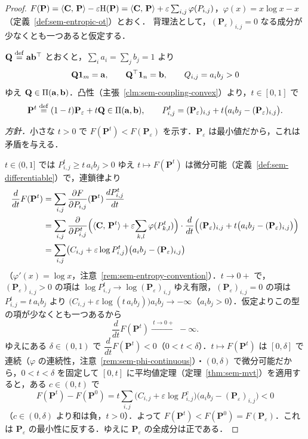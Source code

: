\begin{proof}
  $F(\mathbf{P}) = \langle \mathbf{C},\, \mathbf{P} \rangle - \varepsilon\mathrm{H}(\mathbf{P}) = \langle \mathbf{C},\, \mathbf{P} \rangle + \varepsilon\sum_{i,j}\varphi(P_{i,j})$，$\varphi(x) = x\log x - x$（定義~\ref{def:sem-entropic-ot}）とおく．
  背理法として，$(\mathbf{P}_\varepsilon)_{i,j} = 0$ なる成分が少なくとも一つあると仮定する．

  $\mathbf{Q} \overset{\mathrm{def}}{=} \mathbf{a}\mathbf{b}^\top$ とおくと，$\sum_i a_i = \sum_j b_j = 1$ より
  \[
    \mathbf{Q}\mathbf{1}_m = \mathbf{a}, \qquad
    \mathbf{Q}^\top\mathbf{1}_n = \mathbf{b}, \qquad
    Q_{i,j} = a_i b_j > 0
  \]
  ゆえ $\mathbf{Q} \in \Pi(\mathbf{a}, \mathbf{b})$．凸性（主張~\ref{clm:sem-coupling-convex}）より，$t \in [0,1]$ で
  \[
    \mathbf{P}^t \overset{\mathrm{def}}{=} (1-t)\mathbf{P}_\varepsilon + t\mathbf{Q} \in \Pi(\mathbf{a}, \mathbf{b}),
    \qquad
    P^t_{i,j} = (\mathbf{P}_\varepsilon)_{i,j} + t\bigl(a_i b_j - (\mathbf{P}_\varepsilon)_{i,j}\bigr) .
  \]

  \emph{方針．}小さな $t > 0$ で $F(\mathbf{P}^t) < F(\mathbf{P}_\varepsilon)$ を示す．$\mathbf{P}_\varepsilon$ は最小値だから，これは矛盾を与える．

  $t \in (0,1]$ では $P^t_{i,j} \ge t\,a_i b_j > 0$ ゆえ $t \mapsto F(\mathbf{P}^t)$ は微分可能（定義~\ref{def:sem-differentiable}）で，連鎖律より
  \begin{align*}
    \frac{d}{dt} F(\mathbf{P}^t)
    &= \sum_{i,j} \frac{\partial F}{\partial P_{i,j}}(\mathbf{P}^t)\,\frac{dP^t_{i,j}}{dt} \\
    &= \sum_{i,j}
       \frac{\partial}{\partial P^t_{i,j}}\Bigl( \langle \mathbf{C},\, \mathbf{P}^t \rangle + \varepsilon\!\sum_{k,l}\varphi(P^t_{k,l}) \Bigr)
       \cdot \frac{d}{dt}\Bigl( (\mathbf{P}_\varepsilon)_{i,j} + t\bigl(a_i b_j - (\mathbf{P}_\varepsilon)_{i,j}\bigr) \Bigr) \\
    &= \sum_{i,j} \bigl( C_{i,j} + \varepsilon\log P^t_{i,j} \bigr)\bigl( a_i b_j - (\mathbf{P}_\varepsilon)_{i,j} \bigr)
  \end{align*}
  （$\varphi'(x) = \log x$，注意~\ref{rem:sem-entropy-convention}）．$t \to 0+$ で，$(\mathbf{P}_\varepsilon)_{i,j} > 0$ の項は $\log P^t_{i,j} \to \log (\mathbf{P}_\varepsilon)_{i,j}$ ゆえ有限，$(\mathbf{P}_\varepsilon)_{i,j} = 0$ の項は $P^t_{i,j} = t\,a_i b_j$ より $\bigl(C_{i,j} + \varepsilon\log(t\,a_i b_j)\bigr)a_i b_j \to -\infty$（$a_i b_j > 0$）．仮定よりこの型の項が少なくとも一つあるから
  \[
    \frac{d}{dt} F(\mathbf{P}^t) \xrightarrow{\ t \to 0+\ } -\infty .
  \]
  ゆえにある $\delta \in (0,1)$ で $\dfrac{d}{dt} F(\mathbf{P}^t) < 0$（$0 < t < \delta$）．$t \mapsto F(\mathbf{P}^t)$ は $[0,\delta]$ で連続（$\varphi$ の連続性，注意~\ref{rem:sem-phi-continuous}）・$(0,\delta)$ で微分可能だから，$0 < t < \delta$ を固定して $[0,t]$ に平均値定理（定理~\ref{thm:sem-mvt}）を適用すると，ある $c \in (0,t)$ で
  \[
    F(\mathbf{P}^t) - F(\mathbf{P}^0)
    = t \sum_{i,j}\bigl(C_{i,j} + \varepsilon\log P^c_{i,j}\bigr)\bigl(a_i b_j - (\mathbf{P}_\varepsilon)_{i,j}\bigr) < 0
  \]
  （$c \in (0,\delta)$ より和は負，$t > 0$）．よって $F(\mathbf{P}^t) < F(\mathbf{P}^0) = F(\mathbf{P}_\varepsilon)$．これは $\mathbf{P}_\varepsilon$ の最小性に反する．ゆえに $\mathbf{P}_\varepsilon$ の全成分は正である．
\end{proof}

